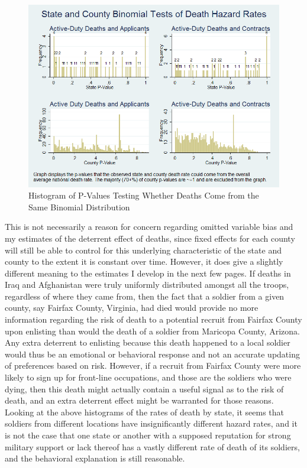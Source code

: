 \documentclass[12pt] {article}
\begin{document}
\begin{figure}
\includegraphics[scale=0.6]{../Output/hist_binomial_combined.png}
\caption{Histogram of P-Values Testing Whether Deaths Come from the
Same Binomial Distribution}
\label{Flo:Pat's Histo}
\end{figure}
\clearpage{}

This is not necessarily a reason for concern regarding omitted variable bias and my estimates of the deterrent effect of deaths,
since fixed effects for each county will still be able to control for this underlying characteristic of the state and county to the extent it is constant over time. However, it does give a slightly different meaning to the estimates I develop in the next few pages. If deaths in Iraq and Afghanistan were truly uniformly
distributed amongst all the troops, regardless of where they came
from, then the fact that a soldier from a given county, say Fairfax
County, Virginia, had died would provide no more information regarding
the risk of death to a potential recruit from Fairfax County upon
enlisting than would the death of a soldier from Maricopa County,
Arizona. Any extra deterrent to enlisting because this death happened to a local soldier would thus be an emotional or behavioral response and not
an accurate updating of preferences based on risk. However, if a recruit
from Fairfax County were more likely to sign up for front-line occupations,
and those are the soldiers who were dying, then this death might actually
contain a useful signal as to the risk of death, and an extra deterrent
effect might be warranted for those reasons. Looking at the above
histograms of the rates of death by state, it seems that soldiers
from different locations have insignificantly different hazard rates, and
it is not the case that one state or another with a supposed reputation
for strong military support or lack thereof has a vastly different
rate of death of its soldiers, and the behavioral explanation is still reasonable.
\end{document}
